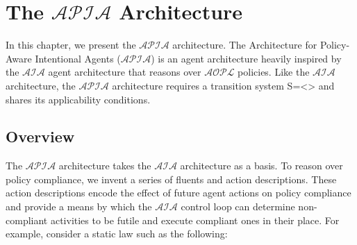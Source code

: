 \chapter{The $\mathcal{APIA}$ Architecture}

%
%
%
%
%
%

In this chapter, we present the $\mathcal{APIA}$ architecture.
The Architecture for Policy-Aware Intentional Agents ($\mathcal{APIA}$) is an agent architecture heavily inspired by the $\mathcal{AIA}$ agent architecture that reasons over $\mathcal{AOPL}$ policies.
Like the $\mathcal{AIA}$ architecture, the $\mathcal{APIA}$ architecture requires a transition system S=<> and shares its applicability conditions.

\section{Overview}

The $\mathcal{APIA}$ architecture takes the $\mathcal{AIA}$ architecture as a basis.
To reason over policy compliance, we invent a series of fluents and action descriptions.
These action descriptions encode the effect of future agent actions on policy compliance and provide a means by which the $\mathcal{AIA}$ control loop can determine non-compliant activities to be futile and execute compliant ones in their place.
For example, consider a static law such as the following:

